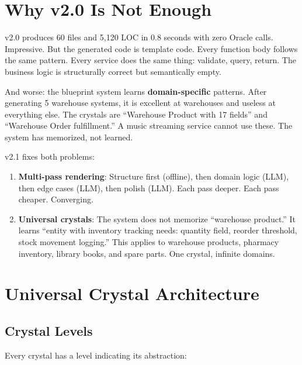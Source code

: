 \documentclass[11pt,a4paper]{article}
\begin{document}
\section{Why v2.0 Is Not Enough}

v2.0 produces 60 files and 5,120 LOC in 0.8 seconds with zero Oracle
calls. Impressive. But the generated code is template code. Every
function body follows the same pattern. Every service does the same
thing: validate, query, return. The business logic is structurally
correct but semantically empty.

And worse: the blueprint system learns \textbf{domain-specific}
patterns. After generating 5 warehouse systems, it is excellent at
warehouses and useless at everything else. The crystals are
``Warehouse Product with 17 fields'' and ``Warehouse Order
fulfillment.'' A music streaming service cannot use these. The system
has memorized, not learned.

v2.1 fixes both problems:

\begin{enumerate}
\item \textbf{Multi-pass rendering}: Structure first (offline),
  then domain logic (LLM), then edge cases (LLM), then polish
  (LLM). Each pass deeper. Each pass cheaper. Converging.
\item \textbf{Universal crystals}: The system does not memorize
  ``warehouse product.'' It learns ``entity with inventory tracking
  needs: quantity field, reorder threshold, stock movement logging.''
  This applies to warehouse products, pharmacy inventory, library
  books, and spare parts. One crystal, infinite domains.
\end{enumerate}

\section{Universal Crystal Architecture}

\subsection{Crystal Levels}

Every crystal has a level indicating its abstraction:
\end{document}
